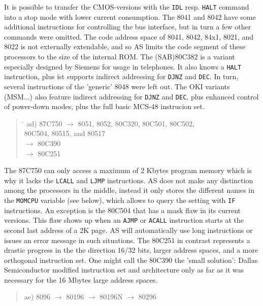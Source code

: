 \documentclass[12pt,twoside]{report}
\newcommand{\tty}[1]{{\tt #1}}
\newcommand{\asname}{{AS}}
\begin{document}
It is possible to transfer the CMOS-versions with the \tty{IDL} resp.
\tty{HALT} command into a stop mode with lower current consumption.
The 8041 and 8042 have some additional instructions for controlling the
bus interface, but in turn a few other commands were omitted.
The code address space of 8041, 8042, 84x1, 8021, and 8022 is not externally
extendable, and so \asname{} limits the code segment of these processors to
the size of the internal ROM.  The (SAB)80C382 is a variant especially
designed by Siemens for usage in telephones.  It also knows a
\tty{HALT} instruction, plus ist supports indirect addressing for
\tty{DJNZ} and \tty{DEC}.  In turn, several instructions of the
'generic' 8048 were left out.  The OKI variants (MSM...) also
feature indirect addressing for \tty{DJNZ} and \tty{DEC}, plus
enhanced control of power-down modes, plus the full basic MCS-48
instrucion set.
\begin{quote}
\begin{tabbing}
\hspace{0.7cm} \= \kill
ad) \> 87C750 $\rightarrow$ 8051, 8052, 80C320, 80C501, 80C502, \\
    \> 80C504, 80515, and 80517 \\
    \> $\rightarrow$ 80C390 \\
    \> $\rightarrow$ 80C251
\end{tabbing}
\end{quote}
The 87C750 can only access a maximum of 2 Kbytes program memory which is
why it lacks the \tty{LCALL} and \tty{LJMP} instructions.  \asname{} does not
make any distinction among the processors in the middle, instead it only
stores the different names in the \tty{MOMCPU} variable (see below), which
allows to query the setting with \tty{IF} instructions.  An exception is
the 80C504 that has a mask flaw in its current versions.  This flaw shows
up when an \tty{AJMP} or \tty{ACALL} instruction starts at the second last
address of a 2K page.  \asname{} will automatically use long instructions or
issues an error message in such situations.  The 80C251 in contrast
represents a drastic progress in the the direction 16/32 bits, larger
address spaces, and a more orthogonal instruction set.  One might call the
80C390 the 'small solution': Dallas Semiconductor modified instruction set
and architecture only as far as it was necessary for the 16 Mbytes large
address spaces.
\begin{quote}
ae) 8096 $\rightarrow$ 80196 $\rightarrow$ 80196N $\rightarrow$ 80296
\end{quote}
\end{document}
